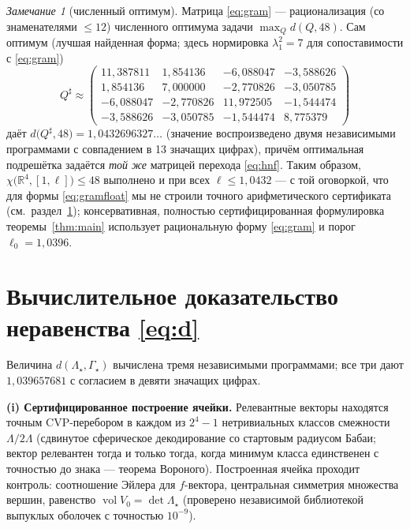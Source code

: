 \documentclass[12pt]{article}
\theoremstyle{definition}
\theoremstyle{remark}
\newtheorem{remark}{Замечание}
\newcommand{\R}{\mathbb{R}}
\begin{document}
\begin{remark}[численный оптимум]\label{rem:float}
Матрица \eqref{eq:gram} --- рационализация (со знаменателями $\le12$)
численного оптимума задачи $\max_Q d(Q,48)$. Сам оптимум (лучшая найденная
форма; здесь нормировка $\lambda_1^2=7$ для сопоставимости с \eqref{eq:gram})
\begin{equation}\label{eq:gramfloat}
Q^\sharp\approx
\begin{pmatrix}
11{,}387811 & 1{,}854136 & -6{,}088047 & -3{,}588626\\
1{,}854136 & 7{,}000000 & -2{,}770826 & -3{,}050785\\
-6{,}088047 & -2{,}770826 & 11{,}972505 & -1{,}544474\\
-3{,}588626 & -3{,}050785 & -1{,}544474 & 8{,}775379
\end{pmatrix}
\end{equation}
даёт $d\bigl(Q^\sharp,48\bigr)=1{,}0432696327\ldots$ (значение воспроизведено
двумя независимыми программами с совпадением в 13 значащих цифрах), причём
оптимальная подрешётка задаётся \emph{той же} матрицей перехода \eqref{eq:hnf}.
Таким образом, $\chi\bigl(\R^4,[1,\ell]\bigr)\le48$ выполнено и при всех
$\ell\le1{,}0432$ --- с той оговоркой, что для формы \eqref{eq:gramfloat} мы
не строили точного арифметического сертификата (см.~раздел~\ref{sec:comp});
консервативная, полностью сертифицированная формулировка
теоремы~\ref{thm:main} использует рациональную форму \eqref{eq:gram} и порог
$\ell_0=1{,}0396$.
\end{remark}

\section{Вычислительное доказательство неравенства \eqref{eq:d}}\label{sec:comp}

Величина $d(\Lambda_\star,\Gamma_\star)$ вычислена тремя независимыми
программами; все три дают $1{,}039657681$ с согласием в девяти значащих
цифрах.

\textbf{(i) Сертифицированное построение ячейки.} Релевантные векторы находятся
точным CVP-перебором в каждом из $2^4-1$ нетривиальных классов смежности
$\Lambda/2\Lambda$ (сдвинутое сферическое декодирование со стартовым радиусом
Бабаи; вектор релевантен тогда и только тогда, когда минимум класса единственен
с точностью до знака --- теорема Вороного). Построенная ячейка проходит
контроль: соотношение Эйлера для $f$-вектора, центральная симметрия множества
вершин, равенство $\operatorname{vol}V_0=\det\Lambda_\star$ (проверено
независимой библиотекой выпуклых оболочек с точностью $10^{-9}$).
\end{document}
